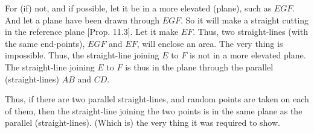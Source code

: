 \begin{Parallel}{}{}
{For (if)  not, and if possible, let it be in a more elevated (plane), such as
$EGF$. And let a plane have been drawn through $EGF$. So it will
make a straight cutting in the reference plane [Prop. 11.3]. Let it make $EF$. Thus, two straight-lines (with the
same end-points), $EGF$ and $EF$,  will enclose an area. The very thing is
impossible. Thus, the straight-line joining $E$ to $F$ is not in a more
elevated plane. The straight-line joining $E$ to $F$ is thus in the plane
through the parallel (straight-lines) $AB$ and $CD$.

Thus, if there are two parallel straight-lines, and
random points are taken on each of them, then the straight-line joining the
two points is in the same plane as the parallel (straight-lines). (Which is)
the very thing it was required to show.}
\end{Parallel}

